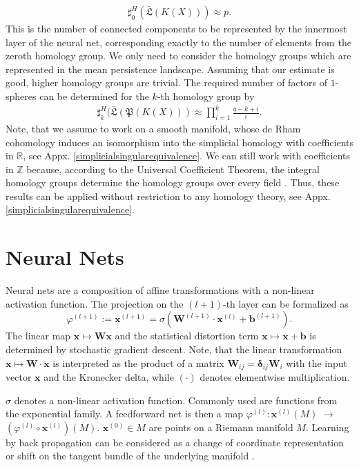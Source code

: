 \documentclass[envcountsect,runningheads]{llncs}
\begin{document}
\begin{align}
	\label{countingsimple}
	\sharp_{0}^{H}(\bar{\mathfrak{L}}(K(X))) \approx p.
\end{align}
This is the number of connected components to be represented by the innermost layer of the neural net, corresponding exactly to the number of elements from the zeroth homology group. We only need to consider the homology groups which are represented in the mean persistence landscape. Assuming that our estimate is good, higher homology groups are trivial. The required number of factors of $1$-spheres can be determined for the $k$-th homology group by
\begin{align}
	\label{countingequation}
	\sharp_{k}^{H}(\bar{\mathfrak{L}}(\mathfrak{P}(K(X))) \approx \prod_{i=1}^{k} \frac{q-k+i}{i}.
\end{align}
Note, that we assume to work on a smooth manifold, whose de Rham cohomology induces an isomorphism into the simplicial homology with coefficients in $\mathbb{R}$, see Appx. \ref{simplicialsingularequivalence}. We can still work with coefficients in $\mathbb{Z}$ because, according to the Universal Coefficient Theorem, the integral homology groups determine the homology groups over every field \cite{gruenberg1968universal}. Thus, these results can be applied without restriction to any homology theory, see Appx. \ref{simplicialsingularequivalence}.

\section{Neural Nets}
\label{sec:neuralnettheory}
Neural nets are a composition of affine transformations with a non-linear activation function. The projection on the $(l+1)$-th layer can be formalized as
\begin{equation}
\label{neuralnet}
    \varphi^{(l+1)} := \textbf{x}^{(l+1)} = \sigma(\mathbf{W}^{(l+1)} \cdot \textbf{x}^{(l)}+\textbf{b}^{(l+1)}).
\end{equation}
The linear map $\textbf{x} \mapsto \mathbf{W} \textbf{x}$ and the statistical distortion term $\textbf{x} \mapsto \textbf{x}+\textbf{b}$ is determined by stochastic gradient descent.  Note, that the linear transformation $\textbf{x} \mapsto \mathbf{W} \cdot \textbf{x}$ is interpreted as the product of a matrix $\mathbf{W}_{ij} = \mathbf{\delta}_{ij}\mathbf{W}_i$ with the input vector $\textbf{x}$ and the Kronecker delta, while $(\cdot)$ denotes elementwise multiplication.

$\sigma$ denotes a non-linear activation function. Commonly used are functions from the exponential family. A feedforward net is then a map $\varphi^{(l)}:\textbf{x}^{(l)}(M)$ $\rightarrow$ $\left(\varphi^{(l)}\circ \textbf{x}^{(l)}\right)(M)$. $\textbf{x}^{(0)} \in M$ are points on a Riemann manifold $M$. Learning by back propagation can be considered as a change of coordinate representation or shift on the tangent bundle of the underlying manifold .
\end{document}

